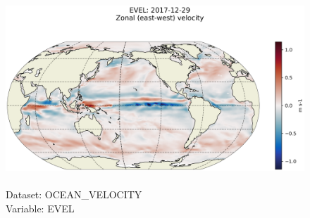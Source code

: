 \begin{figure}[H]
\centering
\includegraphics[scale=0.5]{../images/plots/latlon_plots/Ocean_Velocity/EVEL.png}
\caption{\\Dataset: OCEAN\_VELOCITY\\Variable: EVEL}
\label{tab:table-OCEAN_VELOCITY_EVEL-Plot}
\end{figure}
\pagebreak
